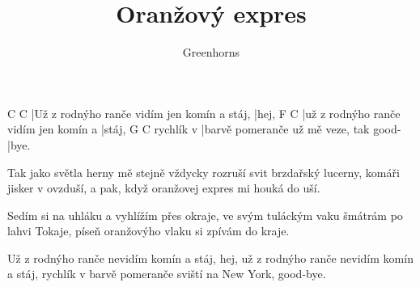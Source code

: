 \documentclass{song}
\title{Oranžový expres}
\author{Greenhorns}
\begin{document}
\strophe
C                                           C\7
|Už z rodnýho ranče vidím jen komín a stáj, |hej,
F                                     C
|už z rodnýho ranče vidím jen komín a |stáj,
          G                                     C
rychlík v |barvě pomeranče už mě veze, tak good-|bye.
\endstrophe

\strophe*
Tak jako světla herny mě stejně vždycky rozruší
svit brzdařský lucerny, komáři jisker v ovzduší,
a pak, když oranžovej expres mi houká do uší.
\endstrophe

\begin{recitative}
\end{recitative}

\strophe*
Sedím si na uhláku a vyhlížím přes okraje,
ve svým tuláckým vaku šmátrám po lahvi Tokaje,
píseň oranžovýho vlaku si zpívám do kraje.
\endstrophe

\strophe*
Už z rodnýho ranče nevidím komín a stáj, hej,
už z rodnýho ranče nevidím komín a stáj,
rychlík v barvě pomeranče sviští na New York, good-bye.
\endstrophe
\end{document}
